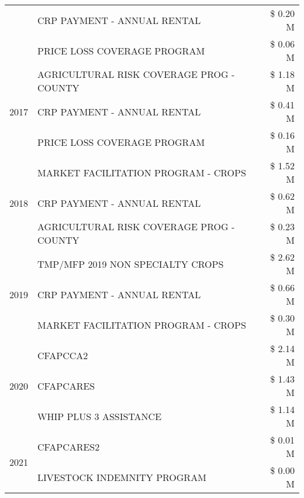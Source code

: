 \begin{tabular}{llr}
 & CRP PAYMENT - ANNUAL RENTAL & \$ 0.20 M \\
 & PRICE LOSS COVERAGE PROGRAM & \$ 0.06 M \\
\cline{1-3}
\multirow[t]{3}{*}{2017} & AGRICULTURAL RISK COVERAGE PROG - COUNTY & \$ 1.18 M \\
 & CRP PAYMENT - ANNUAL RENTAL & \$ 0.41 M \\
 & PRICE LOSS COVERAGE PROGRAM & \$ 0.16 M \\
\cline{1-3}
\multirow[t]{3}{*}{2018} & MARKET FACILITATION PROGRAM - CROPS & \$ 1.52 M \\
 & CRP PAYMENT - ANNUAL RENTAL & \$ 0.62 M \\
 & AGRICULTURAL RISK COVERAGE PROG - COUNTY & \$ 0.23 M \\
\cline{1-3}
\multirow[t]{3}{*}{2019} & TMP/MFP 2019 NON SPECIALTY CROPS & \$ 2.62 M \\
 & CRP PAYMENT - ANNUAL RENTAL & \$ 0.66 M \\
 & MARKET FACILITATION PROGRAM - CROPS & \$ 0.30 M \\
\cline{1-3}
\multirow[t]{3}{*}{2020} & CFAPCCA2 & \$ 2.14 M \\
 & CFAPCARES & \$ 1.43 M \\
 & WHIP PLUS 3 ASSISTANCE & \$ 1.14 M \\
\cline{1-3}
\multirow[t]{2}{*}{2021} & CFAPCARES2 & \$ 0.01 M \\
 & LIVESTOCK INDEMNITY PROGRAM & \$ 0.00 M \\
\cline{1-3}
\bottomrule
\end{tabular}
